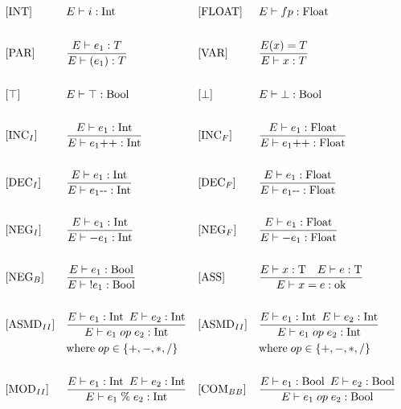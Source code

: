 \begin{align*}
&[\text{INT}]           &  &E \vdash i : \text{Int} & 
&[\text{FLOAT}]           &  &E \vdash fp : \text{Float}\\\\
%
&[\text{PAR}]           &  &\frac{E \vdash e_1 : T}{E \vdash (e_1) : T} & 
&[\text{VAR}]           &  &\frac{E(x) = T}{E \vdash x : T}\\\\
%
&[\top]           &  &E \vdash \top : \text{Bool} & 
&[\bot]           &  &E \vdash \bot : \text{Bool}\\\\
%
&[\text{INC}_I]           &  &\frac{E \vdash e_1 : \text{Int}}{E \vdash e_1\text{++} : \text{Int}} & 
&[\text{INC}_F]           &  &\frac{E \vdash e_1 : \text{Float}}{E \vdash e_1\text{++} : \text{Float}}\\\\
%
&[\text{DEC}_I]           &  &\frac{E \vdash e_1 : \text{Int}}{E \vdash e_1\text{-\medskip-} : \text{Int}} & 
&[\text{DEC}_F]           &  &\frac{E \vdash e_1 : \text{Float}}{E \vdash e_1\text{-\medskip-} : \text{Float}}\\\\
%
&[\text{NEG}_I]           &  &\frac{E \vdash e_1 : \text{Int}}{E \vdash -e_1 : \text{Int}} & 
&[\text{NEG}_F]           &  &\frac{E \vdash e_1 : \text{Float}}{E \vdash -e_1 : \text{Float}}\\\\
%
&[\text{NEG}_B]           &  &\frac{E \vdash e_1 : \text{Bool}}{E \vdash\; !\smallskip e_1 : \text{Bool}} &
&[\text{ASS}]           &  &\frac{E \vdash x : \text{T}\quad E \vdash e : \text{T}}{E \vdash x = e : \text{ok}}\\\\
%
&[\text{ASMD}_{II}]           &  &\frac{E \vdash e_1 : \text{Int} \enskip E \vdash e_2 : \text{Int}}{E \vdash e_1\; op \;e_2 : \text{Int}} & &[\text{ASMD}_{II}]           &  &\frac{E \vdash e_1 : \text{Int} \enskip E \vdash e_2 : \text{Int}}{E \vdash e_1\; op \;e_2 : \text{Int}}\\    
& & &\text{where}\; op \in \{+, -, *, /\} & & & &\text{where}\; op \in \{+, -, *, /\}\\\\
%
&[\text{MOD}_{II}]           &  &\frac{E \vdash e_1 : \text{Int} \enskip E \vdash e_2 : \text{Int}}{E \vdash e_1\; \% \;e_2 : \text{Int}} &
&[\text{COM}_{BB}]           &  &\frac{E \vdash e_1 : \text{Bool} \enskip E \vdash e_2 : \text{Bool}}{E \vdash e_1\; op \;e_2 : \text{Bool}}\\

\end{align*}
